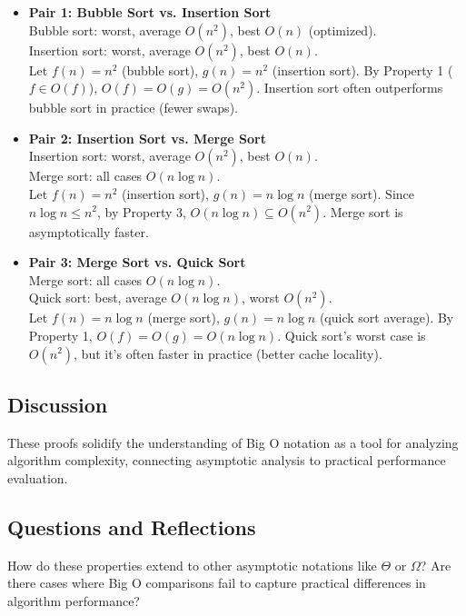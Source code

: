 \documentclass{article}
\theoremstyle{theorem}
\theoremstyle{definition}
\theoremstyle{remark}
\begin{document}
\begin{itemize}
    \item \textbf{Pair 1: Bubble Sort vs. Insertion Sort} \\
    Bubble sort: worst, average \( O(n^2) \), best \( O(n) \) (optimized). \\
    Insertion sort: worst, average \( O(n^2) \), best \( O(n) \). \\
    Let \( f(n) = n^2 \) (bubble sort), \( g(n) = n^2 \) (insertion sort). By Property 1 (\( f \in O(f) \)), \( O(f) = O(g) = O(n^2) \). Insertion sort often outperforms bubble sort in practice (fewer swaps).

    \item \textbf{Pair 2: Insertion Sort vs. Merge Sort} \\
    Insertion sort: worst, average \( O(n^2) \), best \( O(n) \). \\
    Merge sort: all cases \( O(n \log n) \). \\
    Let \( f(n) = n^2 \) (insertion sort), \( g(n) = n \log n \) (merge sort). Since \( n \log n \leq n^2 \), by Property 3, \( O(n \log n) \subseteq O(n^2) \). Merge sort is asymptotically faster.

    \item \textbf{Pair 3: Merge Sort vs. Quick Sort} \\
    Merge sort: all cases \( O(n \log n) \). \\
    Quick sort: best, average \( O(n \log n) \), worst \( O(n^2) \). \\
    Let \( f(n) = n \log n \) (merge sort), \( g(n) = n \log n \) (quick sort average). By Property 1, \( O(f) = O(g) = O(n \log n) \). Quick sort’s worst case is \( O(n^2) \), but it’s often faster in practice (better cache locality).
\end{itemize}

\subsection{Discussion}
These proofs solidify the understanding of Big O notation as a tool for analyzing algorithm complexity, connecting asymptotic analysis to practical performance evaluation.

\subsection{Questions and Reflections}
How do these properties extend to other asymptotic notations like $\Theta$ or $\Omega$? Are there cases where Big O comparisons fail to capture practical differences in algorithm performance?
\end{document}
